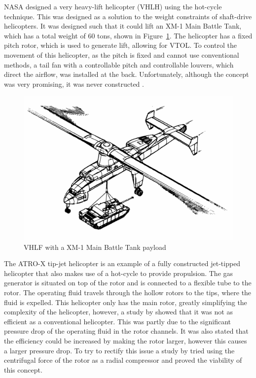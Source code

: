     NASA designed a very heavy-lift helicopter (VHLH) using the hot-cycle technique. This was designed as a solution to the weight constraints of shaft-drive helicopters. It was designed such that it could lift an XM-1 Main Battle Tank, which has a total weight of 60 tons, shown in Figure~\ref{fig:VHLH}. The helicopter has a fixed pitch rotor, which is used to generate lift, allowing for VTOL. To control the movement of this helicopter, as the pitch is fixed and cannot use conventional methods, a tail fan with a controllable pitch and controllable louvers, which direct the airflow, was installed at the back. Unfortunately, although the concept was very promising, it was never constructed \citep{head1981}.\\
    \begin{figure}[H]
        \centering
        \includegraphics[width = 0.6 \textwidth]{figs/Heavy lift Helicopter.png}
        \caption{VHLF with a XM-1 Main Battle Tank payload}
        \label{fig:VHLH}
    \end{figure}

    The ATRO-X tip-jet helicopter is an example of a fully constructed jet-tipped helicopter that also makes use of a hot-cycle to provide propulsion. The gas generator is situated on top of the rotor and is connected to a flexible tube to the rotor. The operating fluid travels through the hollow rotors to the tips, where the fluid is expelled. This helicopter only has the main rotor, greatly simplifying the complexity of the helicopter, however, a study by \cite{KOLAREVIC2020112} showed that it was not as efficient as a conventional helicopter. This was partly due to the significant pressure drop of the operating fluid in the rotor channels. It was also stated that the efficiency could be increased by making the rotor larger, however this causes a larger pressure drop. To try to rectify this issue a study by \cite{elmahmodi2014propulsion} tried using the centrifugal force of the rotor as a radial compressor and proved the viability of this concept.\\

